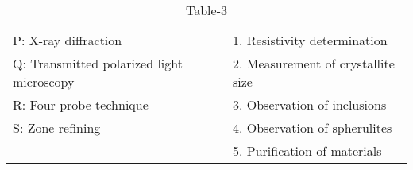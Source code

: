 \begin{table}[htbp]

\caption{Table-3}
\label{table3}
\begin{tabular}{l l}
P: X-ray diffraction & 1. Resistivity determination \\
Q: Transmitted polarized light microscopy & 2. Measurement of crystallite size \\
R: Four probe technique & 3. Observation of inclusions \\
S: Zone refining & 4. Observation of spherulites \\
& 5. Purification of materials \\
\end{tabular}

\end{table}